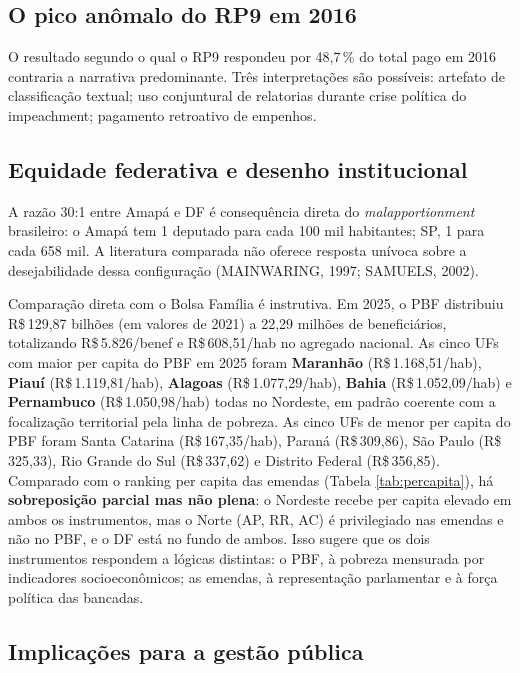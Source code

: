 \documentclass[12pt,a4paper,oneside]{article}
\begin{document}
\subsection{O pico anômalo do RP9 em 2016}

O resultado segundo o qual o RP9 respondeu por 48{,}7\,\% do total
pago em 2016 contraria a narrativa predominante. Três interpretações
são possíveis: artefato de classificação textual; uso conjuntural
de relatorias durante crise política do impeachment; pagamento
retroativo de empenhos.

\subsection{Equidade federativa e desenho institucional}

A razão 30:1 entre Amapá e DF é consequência direta do
\textit{malapportionment} brasileiro: o Amapá tem 1 deputado para
cada 100 mil habitantes; SP, 1 para cada 658 mil. A literatura
comparada não oferece resposta unívoca sobre a desejabilidade dessa
configuração (MAINWARING, 1997; SAMUELS, 2002).

Comparação direta com o Bolsa Família é instrutiva. Em 2025, o PBF
distribuiu R\$\,129{,}87 bilhões (em valores de 2021) a 22{,}29 milhões
de beneficiários, totalizando R\$\,5.826/benef e R\$\,608{,}51/hab no
agregado nacional. As cinco UFs com maior per capita do PBF em 2025
foram \textbf{Maranhão} (R\$\,1.168{,}51/hab), \textbf{Piauí}
(R\$\,1.119{,}81/hab), \textbf{Alagoas} (R\$\,1.077{,}29/hab),
\textbf{Bahia} (R\$\,1.052{,}09/hab) e \textbf{Pernambuco}
(R\$\,1.050{,}98/hab) \textemdash{} todas no Nordeste, em padrão
coerente com a focalização territorial pela linha de pobreza. As
cinco UFs de menor per capita do PBF foram Santa Catarina
(R\$\,167{,}35/hab), Paraná (R\$\,309{,}86), São Paulo (R\$\,325{,}33),
Rio Grande do Sul (R\$\,337{,}62) e Distrito Federal (R\$\,356{,}85).
Comparado com o ranking per capita das emendas (Tabela
\ref{tab:percapita}), há \textbf{sobreposição parcial mas não plena}:
o Nordeste recebe per capita elevado em ambos os instrumentos, mas
o Norte (AP, RR, AC) é privilegiado nas emendas e não no PBF, e o DF
está no fundo de ambos. Isso sugere que os dois instrumentos
respondem a lógicas distintas: o PBF, à pobreza mensurada por
indicadores socioeconômicos; as emendas, à representação parlamentar
e à força política das bancadas.

\subsection{Implicações para a gestão pública}
\end{document}
